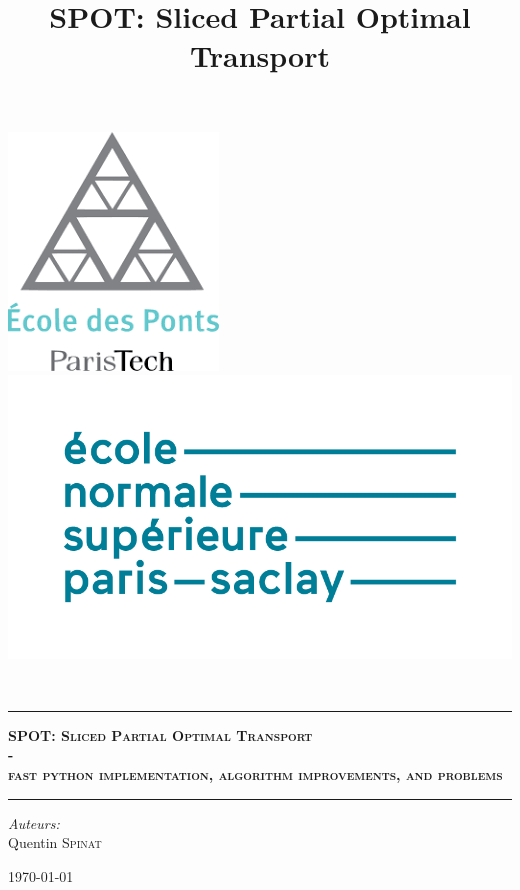 \documentclass[a4paper,12pt]{article}
\title{SPOT: Sliced Partial Optimal Transport}
\begin{document}

\begin{titlepage}
\begin{center}

\includegraphics[scale=0.7]{ENPC.png}
\includegraphics[scale=0.25]{ENS.png}

\textsc{\Large }\\[1cm]

\rule[5pt]{\linewidth}{.7pt}

{\huge \bfseries \textsc{SPOT: Sliced Partial Optimal Transport  \\-\\ fast python implementation, algorithm improvements, and problems\\[0.4cm] }}

\rule[5pt]{\linewidth}{.7pt}

\emph{Auteurs:}\\
Quentin \textsc{Spinat}


\vfill

{\large \today}

\end{center}
\end{titlepage}
\end{document}
